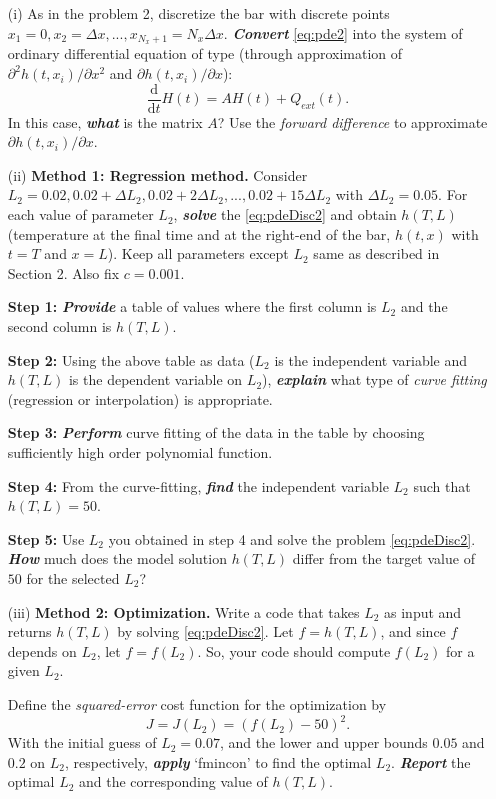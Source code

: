 \documentclass[11pt,a4paper]{article}
\newcommand{\dd}{\mathrm{d}}
\newcommand{\p}{\partial }
\newcommand{\bfit}[1]{\textit{\textbf{#1}}}
\begin{document}
\begin{itemize}
\item[(i)] As in the problem 2, discretize the bar with discrete points $x_1 = 0, x_2 = \Delta x, ..., x_{N_x + 1} = N_x \Delta x$. \bfit{Convert} \eqref{eq:pde2} into the system of ordinary differential equation of type (through approximation of $\p^2 h(t, x_i)/ \p x^2$ and $\p h(t, x_i)/\p x$):
\begin{equation}\label{eq:pdeDisc2}
\frac{\dd }{\dd t} H(t) = A H(t) + Q_{ext} (t).
\end{equation}
In this case, \bfit{what} is the matrix $A$? Use the {\it forward difference} to approximate $\p h(t, x_i)/\p x$. 

\item[(ii)] {\bf Method 1: Regression method.} Consider $L_2 = 0.02, 0.02+\Delta L_2, 0.02 + 2\Delta L_2, ..., 0.02 + 15\Delta L_2$ with $\Delta L_2 = 0.05$. For each value of parameter $L_2$, \bfit{solve} the \eqref{eq:pdeDisc2} and obtain $h(T, L)$ (temperature at the final time and at the right-end of the bar, $h(t, x)$ with $t = T$ and $x = L$). Keep all parameters except $L_2$ same as described in Section 2. Also fix $c = 0.001$.

{\bf Step 1: } \bfit{Provide} a table of values where the first column is $L_2$ and the second column is $h(T, L)$. 

{\bf Step 2: } Using the above table as data ($L_2$ is the independent variable and $h(T, L)$ is the dependent variable on $L_2$), \bfit{explain} what type of {\it curve fitting} (regression or interpolation) is appropriate.

{\bf Step 3: } \bfit{Perform} curve fitting of the data in the table by choosing sufficiently high order polynomial function.

{\bf Step 4: } From the curve-fitting, \bfit{find} the independent variable $L_2$ such that $h(T, L) = 50$. 

{\bf Step 5: } Use $L_2$ you obtained in step 4 and solve the problem \eqref{eq:pdeDisc2}. \bfit{How} much does the model solution $h(T, L)$ differ from the target value of $50$ for the selected $L_2$?

\item[(iii)] {\bf Method 2: Optimization.} Write a code that takes $L_2$ as input and returns $h(T, L)$ by solving \eqref{eq:pdeDisc2}. Let $f = h(T, L)$, and since $f$ depends on $L_2$, let $f = f(L_2)$. So, your code should compute $f(L_2)$ for a given $L_2$. 

Define the {\it squared-error} cost function for the optimization by
\begin{equation}
J = J(L_2) = (f(L_2) - 50)^2.
\end{equation}
With the initial guess of $L_2 = 0.07$, and the lower and upper bounds $0.05$ and $0.2$ on $L_2$, respectively, \bfit{apply} `fmincon' to find the optimal $L_2$. \bfit{Report} the optimal $L_2$ and the corresponding value of $h(T, L)$. 

\end{itemize}
\end{document}
